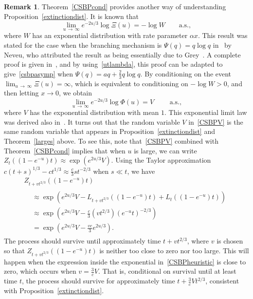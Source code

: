 \documentclass[10pt]{amsart}
\theoremstyle{definition}\newtheorem{defi}[theo]{Definition}\newtheorem{rema}[theo]{Remark}\newtheorem{exam}[theo]{Example}\newtheorem{exem}[theo]{Example}\newtheorem{nota}[theo]{Notation}
\newcommand{\1} {\mathds{1}}
\begin{document}
\begin{rema}
Theorem~\ref{CSBPcond} provides another way of understanding Proposition~\ref{extinctiondist}. It is known that
\begin{equation}\label{csbpasymp}
\lim_{u\,\rightarrow\,\infty} e^{-2u/3} \log \Xi(u) = - \log W \qquad \text{a.s.},
\end{equation}
where $W$ has an exponential distribution with rate parameter $\alpha x$. This result was stated for the case when the branching mechanism is $\Psi(q) = q \log q$ in~\cite{nev92} by Neveu, who attributed the result as being essentially due to Grey~\cite{grey77}. A complete proof is given in~\cite[Appendix~A]{fs04}, and by using~\eqref{utlambda}, this proof can be adapted to give~\eqref{csbpasymp} when $\Psi(q) = aq + \frac{2}{3} q \log q$. By conditioning on the event $\lim_{u\, \rightarrow\,\infty} \Xi(u) = \infty$, which is equivalent to conditioning on $-\log W > 0$, and then letting $x \rightarrow 0$, we obtain
\begin{equation}\label{CSBPV}
\lim_{u\,\rightarrow\,\infty} e^{-2u/3} \log \Phi(u) = V \qquad \text{ a.s.},
\end{equation}
where $V$ has the exponential distribution with mean $1$. This exponential limit law was derived also in~\cite[Proposition~7]{fm19}. It turns out that the random variable $V$ in~\eqref{CSBPV} is the same random variable that appears in Proposition~\ref{extinctiondist} and Theorem~\ref{larges} above. To see this, note that~\eqref{CSBPV} combined with Theorem~\ref{CSBPcond} implies that when $u$ is large, we can write $Z_t((1 - e^{-u})t) \approx \exp(e^{2u/3} V)$. Using the Taylor approximation $c(t + s)^{1/3} - ct^{1/3} \approx \frac{c}{3} s t^{-2/3}$ when $s \ll t$, we have
\begin{multline}\label{CSBPheuristic}
Z_{t + vt^{2/3}}\left(\left(1 - e^{-u}\right)t\right)\\
\begin{aligned}
&\approx \exp \left(e^{2u/3} V - L_{t + vt^{2/3}}\left(\left(1 - e^{-u}\right)t\right) + L_t\left(\left(1 - e^{-u}\right)t\right) \right) \\
&\approx \exp \left(e^{2u/3} V - \frac{c}{3}\left(v t^{2/3}\right) \left(e^{-u} t\right)^{-2/3} \right) \\
&= \exp\left(e^{2u/3} V - \frac{vc}{3} e^{2u/3} \right).
\end{aligned}
\end{multline}
The process should survive until approximately time $t + vt^{2/3}$, where $v$ is chosen so that $Z_{t + vt^{2/3}}((1 - e^{-u})t)$ is neither too close to zero nor too large. This will happen when the expression inside the exponential in~\eqref{CSBPheuristic} is close to zero, which occurs when $v = \frac{3}{c}V$. That is, conditional on survival until at least time $t$, the process should survive for approximately time $t + \frac{3}{c} V t^{2/3}$, consistent with Proposition~\ref{extinctiondist}.
\end{rema}
\end{document}
